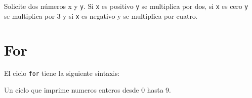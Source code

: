 \begin{code}
Solicite dos números x y \texttt{y}. Si \texttt{x}
es positivo \texttt{y} se multiplica por dos, si \texttt{x} es cero
\texttt{y} se multiplica por 3 y si \texttt{x} es negativo y se
multiplica por cuatro.

\begin{Shaded}
\begin{Highlighting}[]
\OperatorTok{=}\NormalTok{(}\NormalTok{(}\NormalTok{))}
\OperatorTok{=}\NormalTok{(}\NormalTok{(}\NormalTok{))}
    \OperatorTok{\textgreater{}}\NormalTok{:}
\OperatorTok{=}\OperatorTok{*}
        \NormalTok{(}\NormalTok{)}
    \OperatorTok{==}\NormalTok{:}
\OperatorTok{=}\OperatorTok{*}
        \NormalTok{(}\NormalTok{)}
    \NormalTok{:}
\OperatorTok{=}\OperatorTok{*}
        \NormalTok{(}\NormalTok{)}
\end{Highlighting}
\end{Shaded}
\end{code}

\section{For}

El ciclo \texttt{for} tiene la siguiente sintaxis:

\begin{Shaded}
\begin{Highlighting}[]

\end{Highlighting}
\end{Shaded}

\begin{code} Un ciclo que imprime numeros enteros desde 0 hasta 9.

\begin{Shaded}
\begin{Highlighting}[]
 \NormalTok{(}\NormalTok{):}
\end{Highlighting}
\end{Shaded}
    
\end{code}
 

